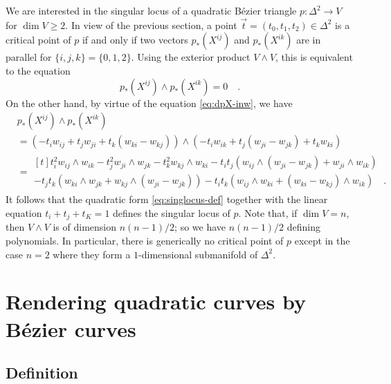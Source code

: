 \documentclass[pdftex,a4paper,12pt]{scrartcl}
\theoremstyle{plain}
\theoremstyle{definition}
\theoremstyle{remark}
\begin{document}
We are interested in the singular locus of a quadratic B\'ezier triangle $p:\Delta^2\to V$ for $\dim V\ge 2$.
In view of the previous section, a point $\vec t=(t_0,t_1,t_2)\in\Delta^2$ is a critical point of $p$ if and only if two vectors $p_\ast(X^{ij})$ and $p_\ast(X^{ik})$ are in parallel for $\{i,j,k\}=\{0,1,2\}$.
Using the exterior product $V\wedge V$, this is equivalent to the equation
\[
p_\ast(X^{ij})\wedge p_\ast(X^{ik})=0
\quad.
\]
On the other hand, by virtue of the equation \eqref{eq:dpX-inw}, we have
\begin{equation}
\label{eq:singlocus-def}
\begin{split}
& p_\ast(X^{ij})\wedge p_\ast(X^{ik}) \\
&= \left(-t_iw_{ij}+t_jw_{ji}+t_k(w_{ki}-w_{kj})\right)\wedge\left(-t_iw_{ik}+t_j(w_{ji}-w_{jk})+t_kw_{ki}\right) \\
&=
\begin{multlined}[t]
t_i^2 w_{ij}\wedge w_{ik}-t_j^2w_{ji}\wedge w_{jk}-t_k^2w_{kj}\wedge w_{ki}
- t_it_j\left(w_{ij}\wedge(w_{ji}-w_{jk})+w_{ji}\wedge w_{ik}\right) \\
- t_jt_k\left(w_{ki}\wedge w_{jk}+w_{kj}\wedge(w_{ji}-w_{jk})\right)
- t_it_k\left(w_{ij}\wedge w_{ki}+(w_{ki}-w_{kj})\wedge w_{ik}\right)
\quad.
\end{multlined}
\end{split}
\end{equation}
It follows that the quadratic form \eqref{eq:singlocus-def} together with the linear equation $t_i+t_j+t_K=1$ defines the singular locus of $p$.
Note that, if $\dim V=n$, then $V\wedge V$ is of dimension $n(n-1)/2$; so we have $n(n-1)/2$ defining polynomials.
In particular, there is generically no critical point of $p$ except in the case $n=2$ where they form a $1$-dimensional submanifold of $\Delta^2$.


\section{Rendering quadratic curves by B\'ezier curves}

\subsection{Definition}
\end{document}
